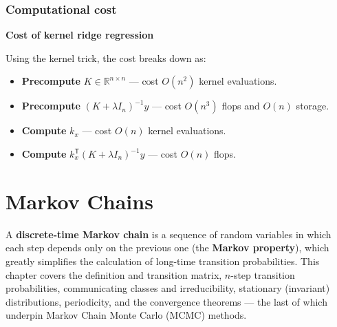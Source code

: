 \documentclass[
  letterpaper,
  DIV=11,
  numbers=noendperiod]{scrreprt}
\providecommand{\tightlist}{%
  \setlength{\itemsep}{0pt}\setlength{\parskip}{0pt}}
\theoremstyle{definition}
\theoremstyle{plain}
\theoremstyle{plain}
\theoremstyle{definition}
\theoremstyle{plain}
\theoremstyle{plain}
\theoremstyle{remark}
\begin{document}
\subsection{Computational cost}\label{computational-cost}

\begin{tcolorbox}[enhanced jigsaw, leftrule=.75mm, bottomrule=.15mm, left=2mm, colback=white, colframe=quarto-callout-note-color-frame, toprule=.15mm, breakable, arc=.35mm, rightrule=.15mm, opacityback=0]
\begin{minipage}[t]{5.5mm}
\textcolor{quarto-callout-note-color}{\faInfo}
\end{minipage}%
\begin{minipage}[t]{\textwidth - 5.5mm}

\vspace{-3mm}\textbf{Cost of kernel ridge regression}\vspace{3mm}

Using the kernel trick, the cost breaks down as:

\begin{itemize}
\tightlist
\item
  \textbf{Precompute} \(K \in \mathbb{R}^{n \times n}\) --- cost
  \(O(n^2)\) kernel evaluations.
\item
  \textbf{Precompute} \((K + \lambda I_n)^{-1} y\) --- cost \(O(n^3)\)
  flops and \(O(n)\) storage.
\item
  \textbf{Compute} \(k_x\) --- cost \(O(n)\) kernel evaluations.
\item
  \textbf{Compute} \(k_x^{\mathsf T}(K + \lambda I_n)^{-1} y\) --- cost
  \(O(n)\) flops.
\end{itemize}

\end{minipage}%
\end{tcolorbox}

\chapter{Markov Chains}\label{markov-chains}

A \textbf{discrete-time Markov chain} is a sequence of random variables
in which each step depends only on the previous one (the \textbf{Markov
property}), which greatly simplifies the calculation of long-time
transition probabilities. This chapter covers the definition and
transition matrix, \(n\)-step transition probabilities, communicating
classes and irreducibility, stationary (invariant) distributions,
periodicity, and the convergence theorems --- the last of which underpin
Markov Chain Monte Carlo (MCMC) methods.
\end{document}
